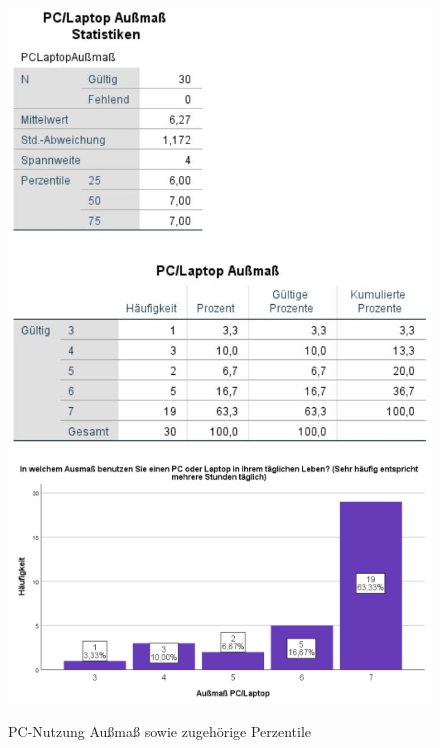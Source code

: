 \documentclass[a4paper,11pt]{article}%
\renewcommand{\\}{\vspace*{0.5\baselineskip} \newline}
\begin{document}
	\begin{figure}[H]
		\begin{footnotesize}
			\includegraphics[width=\textwidth]{Abbildungen/Pre_QuestionnaireStatistiks/teilnehmerPCAußmaß}\\
			\includegraphics[width=\textwidth]{Abbildungen/Demographie/teilnehmerPCAußmaß}\\
			\caption{PC-Nutzung Außmaß sowie zugehörige Perzentile}
			\label{fig:teilnehmerPCAußmaß}
		\end{footnotesize}
	\end{figure}		
	
\end{document}
